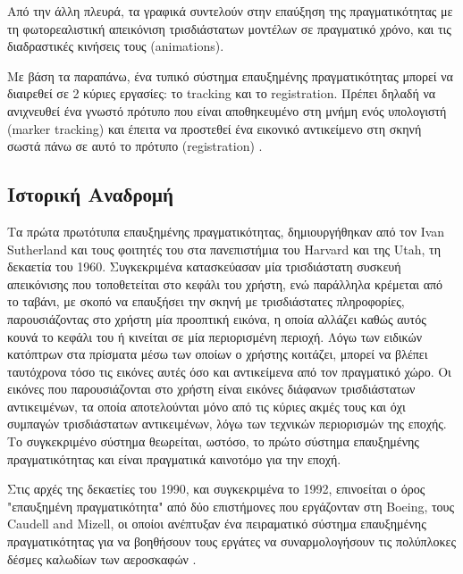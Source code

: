 Από την άλλη πλευρά, τα γραφικά συντελούν στην επαύξηση της πραγματικότητας με τη φωτορεαλιστική απεικόνιση τρισδιάστατων μοντέλων σε πραγματικό χρόνο, και τις διαδραστικές κινήσεις τους (animations).



Με βάση τα παραπάνω, ένα τυπικό σύστημα επαυξημένης πραγματικότητας μπορεί να διαιρεθεί σε 2 κύριες εργασίες: το tracking και το registration. Πρέπει δηλαδή να ανιχνευθεί ένα γνωστό πρότυπο που είναι αποθηκευμένο στη μνήμη ενός υπολογιστή (marker tracking) και έπειτα να προστεθεί ένα εικονικό αντικείμενο στη σκηνή σωστά πάνω σε αυτό το πρότυπο (registration) \cite{krevelen2010}.



\subsection{Ιστορική Αναδρομή}



Τα πρώτα πρωτότυπα επαυξημένης πραγματικότητας, δημιουργήθηκαν από τον Ivan Sutherland και τους φοιτητές του στα πανεπιστήμια του Harvard και της Utah, τη δεκαετία του 1960. Συγκεκριμένα κατασκεύασαν μία τρισδιάστατη συσκευή απεικόνισης που τοποθετείται στο κεφάλι του χρήστη, ενώ παράλληλα κρέμεται από το ταβάνι, με σκοπό να επαυξήσει την σκηνή με τρισδιάστατες πληροφορίες, παρουσιάζοντας στο χρήστη μία προοπτική εικόνα, η οποία αλλάζει καθώς αυτός κουνά το κεφάλι του ή κινείται σε μία περιορισμένη περιοχή. Λόγω των ειδικών κατόπτρων στα πρίσματα μέσω των οποίων ο χρήστης κοιτάζει, μπορεί να βλέπει ταυτόχρονα τόσο τις εικόνες αυτές όσο και αντικείμενα από τον πραγματικό χώρο. Οι εικόνες που παρουσιάζονται στο χρήστη είναι εικόνες διάφανων τρισδιάστατων αντικειμένων, τα οποία αποτελούνται μόνο από τις κύριες ακμές τους και όχι συμπαγών τρισδιάστατων αντικειμένων, λόγω των τεχνικών περιορισμών της εποχής. Το συγκεκριμένο σύστημα θεωρείται, ωστόσο, το πρώτο σύστημα επαυξημένης πραγματικότητας και είναι πραγματικά καινοτόμο για την εποχή. \cite{sutherland1968head}



Στις αρχές της δεκαετίες του 1990, και συγκεκριμένα το 1992, επινοείται ο όρος "επαυξημένη πραγματικότητα" από δύο επιστήμονες που εργάζονταν στη Boeing, τους Caudell and Mizell, οι οποίοι ανέπτυξαν ένα πειραματικό σύστημα επαυξημένης πραγματικότητας για να βοηθήσουν τους εργάτες να συναρμολογήσουν τις πολύπλοκες δέσμες καλωδίων των αεροσκαφών \cite{caudell1992augmented}. 


